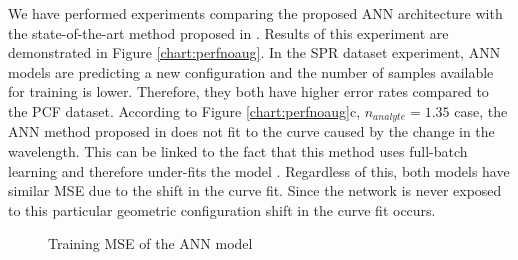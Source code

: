 \documentclass[journal]{IEEEtran}
\begin{document}
We have performed experiments comparing the proposed ANN architecture with the state-of-the-art method proposed in \cite{paper0}. Results of this experiment are demonstrated in Figure \ref{chart:perfnoaug}. In the SPR dataset experiment, ANN models are predicting a new configuration and the number of samples available for training is lower. Therefore, they both have higher error rates compared to the PCF dataset. According to Figure \ref{chart:perfnoaug}c, $n_{analyte} = 1.35$ case, the ANN method proposed in \cite{paper0} does not fit to the curve caused by the change in the wavelength. This can be linked to the fact that this method uses full-batch learning and therefore under-fits the model \cite{keskar2016large}. Regardless of this, both models have similar MSE due to the shift in the curve fit. Since the network is never exposed to this particular geometric configuration shift in the curve fit occurs.

\begin{figure}
	\begin{subfigure}{.48\textwidth}
		\centering
	\end{subfigure}	
	
	
	\caption{Training MSE of the ANN model}
	\label{chart:trainingmse}
\end{figure}
\end{document}

